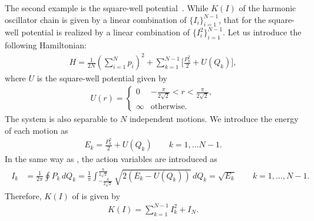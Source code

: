 The second example is the square-well potential~\cite{Reichl-1992}.
While $K(I)$ of the harmonic oscillator chain is given by a linear combination of $\{I_i\}_{i=1}^{N-1}$, that for the square-well potential is realized by a linear combination of $\{I_i^2\}_{i=1}^{N-1}$.
Let us introduce the following Hamiltonian:
\begin{align}
  H = \frac{1}{2N}\left(\sum_{i=1}^N p_i\right)^2 + \sum_{k=1}^{N-1} \Big[ \frac{P_k^2}{2} + U(Q_k) \Big], \label{eq:hamiltonian_potential_well}
\end{align}
where $U$ is the square-well potential given by
\begin{align}
  U(r) = \begin{cases}
            0 & -\frac{\pi}{2\sqrt{2}} < r < \frac{\pi}{2\sqrt{2}}, \\
            \infty & \mathrm{otherwise}.
         \end{cases} \label{eq:potential_well}
\end{align}
The system is also separable to $N$ independent motions.
We introduce the energy of each motion as
\begin{align}
  E_k = \frac{P_k^2}{2} + U(Q_k) \qquad k = 1, \ldots N-1.
\end{align}
In the same way as , the action variables are introduced as
\begin{align}
  \begin{split}
    I_k & = \frac{1}{2\pi}\oint P_k \, dQ_k
        = \frac{1}{\pi} \int_{-\frac{\pi}{2\sqrt{2}}}^{\frac{\pi}{2\sqrt{2}}} \sqrt{2\left(E_k-U(Q_k)\right)} \, dQ_k
        = \sqrt{E_k} \qquad k=1,\ldots,N-1.
  \end{split}
\end{align}
Therefore, $K(I)$ of  is given by
\begin{align}
 K(I) = \sum_{k=1}^{N-1} I_k^2 + I_N \label{eq:potential_well_K_I}.
\end{align}

